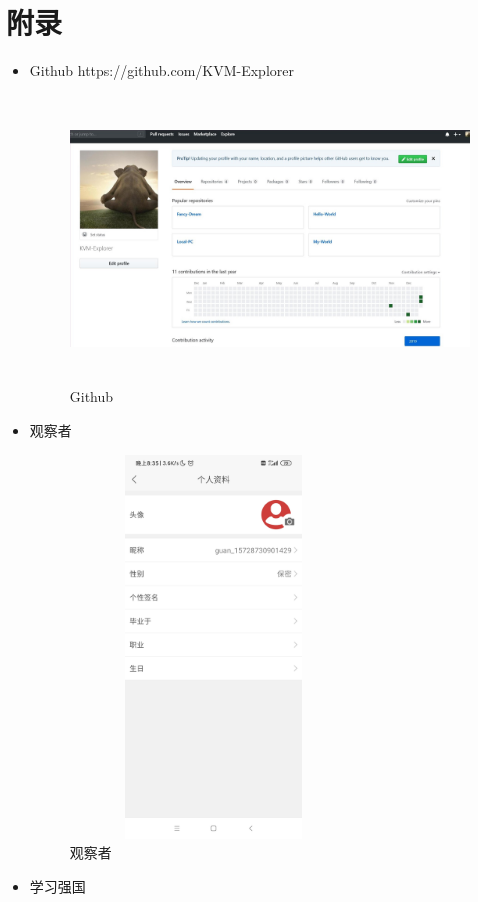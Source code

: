 \documentclass{article}
\begin{document}
\section{附录}
\begin{itemize}
    \item Github https://github.com/KVM-Explorer
    	\begin{figure}[H]
		\centering
		\includegraphics[width=5in,height=3in]{github.jpg}
		\caption{Github}
		\end{figure}
    \item 观察者
    	\begin{figure}[H]
		\centering
		\includegraphics[height=4in,width=3in]{guanchazhe.jpg}
		\caption{观察者}
		\label{fig2}
		\end{figure}
	\item 学习强国
		\begin{figure}[H]
		\centering

\end{figure}
\end{itemize}
\end{document}
